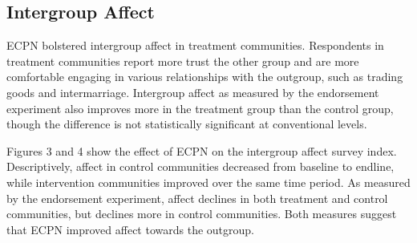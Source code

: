 \documentclass[]{article}
\begin{document}
\hypertarget{intergroup-affect}{%
\subsection{Intergroup Affect}\label{intergroup-affect}}

ECPN bolstered intergroup affect in treatment communities. Respondents
in treatment communities report more trust the other group and are more
comfortable engaging in various relationships with the outgroup, such as
trading goods and intermarriage. Intergroup affect as measured by the
endorsement experiment also improves more in the treatment group than
the control group, though the difference is not statistically
significant at conventional levels.

Figures 3 and 4 show the effect of ECPN on the intergroup affect survey
index. Descriptively, affect in control communities decreased from
baseline to endline, while intervention communities improved over the
same time period. As measured by the endorsement experiment, affect
declines in both treatment and control communities, but declines more in
control communities. Both measures suggest that ECPN improved affect
towards the outgroup.
\end{document}
